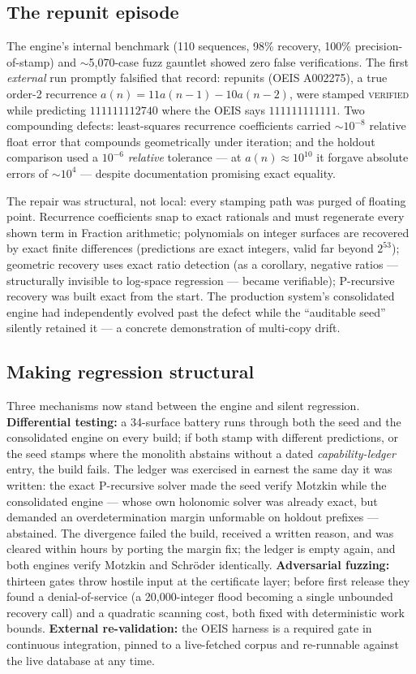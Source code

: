 \documentclass[11pt]{article}
\newcommand{\Verified}{\textsc{verified}}
\begin{document}
\subsection{The repunit episode}
The engine's internal benchmark (110 sequences, 98\% recovery, 100\%
precision-of-stamp) and $\sim$5{,}070-case fuzz gauntlet showed zero false
verifications. The first \emph{external} run promptly falsified that record:
repunits (OEIS A002275), a true order-2 recurrence
$a(n)=11a(n{-}1)-10a(n{-}2)$, were stamped \Verified{} while predicting
$111111112740$ where the OEIS says $111111111111$. Two compounding defects:
least-squares recurrence coefficients carried $\sim10^{-8}$ relative float
error that compounds geometrically under iteration; and the holdout
comparison used a $10^{-6}$ \emph{relative} tolerance --- at
$a(n)\approx10^{10}$ it forgave absolute errors of $\sim10^{4}$ --- despite
documentation promising exact equality.

The repair was structural, not local: every stamping path was purged of
floating point. Recurrence coefficients snap to exact rationals and must
regenerate every shown term in Fraction arithmetic; polynomials on integer
surfaces are recovered by exact finite differences (predictions are exact
integers, valid far beyond $2^{53}$); geometric recovery uses exact ratio
detection (as a corollary, negative ratios --- structurally invisible to
log-space regression --- became verifiable); P-recursive recovery was built
exact from the start. The production system's consolidated engine had
independently evolved past the defect while the ``auditable seed'' silently
retained it --- a concrete demonstration of multi-copy drift.

\subsection{Making regression structural}
Three mechanisms now stand between the engine and silent regression.
\textbf{Differential testing:} a 34-surface battery runs through both the
seed and the consolidated engine on every build; if both stamp with
different predictions, or the seed stamps where the monolith abstains
without a dated \emph{capability-ledger} entry, the build fails. The ledger
was exercised in earnest the same day it was written: the exact P-recursive
solver made the seed verify Motzkin while the consolidated engine ---
whose own holonomic solver was already exact, but demanded an
overdetermination margin unformable on holdout prefixes --- abstained.
The divergence failed the build, received a written reason, and was cleared
within hours by porting the margin fix; the ledger is empty again, and both
engines verify Motzkin and Schr\"oder identically. \textbf{Adversarial fuzzing:}
thirteen gates throw hostile input at the certificate layer; before first
release they found a denial-of-service (a 20{,}000-integer flood becoming a
single unbounded recovery call) and a quadratic scanning cost, both fixed
with deterministic work bounds. \textbf{External re-validation:} the OEIS
harness is a required gate in continuous integration, pinned to a
live-fetched corpus and re-runnable against the live database at any time.
\end{document}

